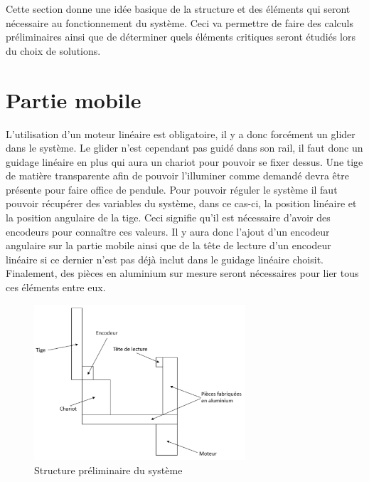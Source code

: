 Cette section donne une idée basique de la structure et des éléments qui seront nécessaire au fonctionnement du système.
Ceci va permettre de faire des calculs préliminaires ainsi que de déterminer quels éléments critiques seront étudiés lors du choix
de solutions.

\section{Partie mobile}\label{sec:PartMob}
L'utilisation d'un moteur linéaire est obligatoire, il y a donc forcément un \gls{glider} dans le système. Le \gls{glider} n'est cependant
pas guidé dans son rail, il faut donc un guidage linéaire en plus qui aura un chariot pour pouvoir se fixer dessus. Une tige de matière
transparente afin de pouvoir l'illuminer comme demandé devra être présente pour faire office de pendule. Pour pouvoir réguler le système il faut pouvoir récupérer des variables
du système, dans ce cas-ci, la position linéaire et la position angulaire de la tige. Ceci signifie qu'il est nécessaire d'avoir des encodeurs
pour connaître ces valeurs. Il y aura donc l'ajout d'un encodeur angulaire sur la partie mobile ainsi que de la tête de lecture d'un encodeur
linéaire si ce dernier n'est pas déjà inclut dans le guidage linéaire choisit. Finalement, des pièces en aluminium sur mesure seront nécessaires
pour lier tous ces éléments entre eux.

\begin{figure}[H]
  \centering
  \includegraphics[width = 0.7\textwidth]{assets/figures/StructPrelim.svg}
  \caption{Structure préliminaire du système}
  \label{fig:StructPrelim}
\end{figure}